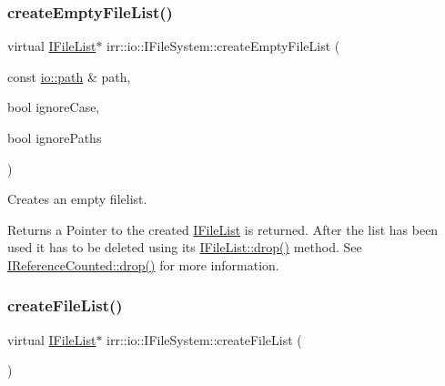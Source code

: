\subsubsection{\texorpdfstring{create\+Empty\+File\+List()}{createEmptyFileList()}\hspace{0.1cm}{\footnotesize\ttfamily [2/2]}}
{\footnotesize\ttfamily virtual \hyperlink{classirr_1_1io_1_1IFileList}{I\+File\+List}$\ast$ irr\+::io\+::\+I\+File\+System\+::create\+Empty\+File\+List (\begin{DoxyParamCaption}\item[{const \hyperlink{namespaceirr_1_1io_a6468281622ce3a1c46b72e19f32dded5}{io\+::path} \&}]{path,  }\item[{bool}]{ignore\+Case,  }\item[{bool}]{ignore\+Paths }\end{DoxyParamCaption})\hspace{0.3cm}{\ttfamily [pure virtual]}}



Creates an empty filelist. 

\begin{DoxyReturn}{Returns}
a Pointer to the created \hyperlink{classirr_1_1io_1_1IFileList}{I\+File\+List} is returned. After the list has been used it has to be deleted using its \hyperlink{classirr_1_1IReferenceCounted_a03856a09355b89d178090c4a5f738543}{I\+File\+List\+::drop()} method. See \hyperlink{classirr_1_1IReferenceCounted_a03856a09355b89d178090c4a5f738543}{I\+Reference\+Counted\+::drop()} for more information. 
\end{DoxyReturn}
\mbox{\label{classirr_1_1io_1_1IFileSystem_ad5820e7664377c12015ea7a6c801f7f8}} 
\subsubsection{\texorpdfstring{create\+File\+List()}{createFileList()}\hspace{0.1cm}{\footnotesize\ttfamily [1/2]}}
{\footnotesize\ttfamily virtual \hyperlink{classirr_1_1io_1_1IFileList}{I\+File\+List}$\ast$ irr\+::io\+::\+I\+File\+System\+::create\+File\+List (\begin{DoxyParamCaption}{ }\end{DoxyParamCaption})\hspace{0.3cm}{\ttfamily [pure virtual]}}



